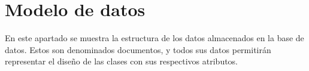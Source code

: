 \section{Modelo de datos}

En este apartado se muestra la estructura de los datos almacenados en la base de datos. Estos son denominados documentos, y todos sus datos permitirán representar el diseño de las clases con sus respectivos atributos.


